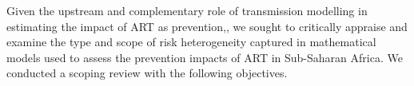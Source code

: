 \par
Given the upstream and complementary role of transmission modelling
in estimating the impact of ART as prevention,\cite{Eaton2012,Delva2012},
we sought to critically appraise and examine the type and scope of risk heterogeneity captured
in mathematical models used to assess the prevention impacts of ART in Sub-Saharan Africa.
We conducted a scoping review with the following objectives.
